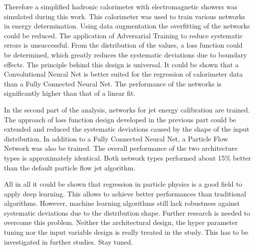 \documentclass[12pt, a4paper]{thesis}
\begin{document}
Therefore a simplified hadronic calorimeter with electromagnetic
showers was simulated during this work. This calorimeter was used to
train various networks in energy determination.  Using data
augmentation the overfitting of the networks could be reduced. The
application of Adversarial Training to reduce systematic errors is
unsuccessful.  From the distribution of the values, a loss function
could be determined, which greatly reduces the systematic deviations
due to boundary effects. The principle behind this design is
universal. It could be shown that a Convolutional Neural Net is better
suited for the regression of calorimeter data than a Fully Connected
Neural Net. The performance of the networks is significantly higher
than that of a linear fit.

In the second part of the analysis, networks for jet energy
calibration are trained.  The approach of loss function design
developed in the previous part could be extended and reduced the
systematic deviations caused by the shape of the input
distribution. In addition to a Fully Connected Neural Net, a Particle
Flow Network was also be trained. The overall performance of the two
architecture types is approximately identical. Both network types
performed about 15\% better than the default particle flow jet
algorithm.

All in all it could be shown that regression in particle physics is a
good field to apply deep learning. This allows to achieve better
performances than traditional algorithms. However, machine learning
algorithms still lack robustness against systematic deviations due to
the distribution shape. Further research is needed to overcome this
problem. Neither the architectural design, the hyper parameter tuning
nor the input variable design is really treated in the study. This has
to be investigated in further studies. Stay tuned.


\appendix
\cleardoublepage



\end{document}
